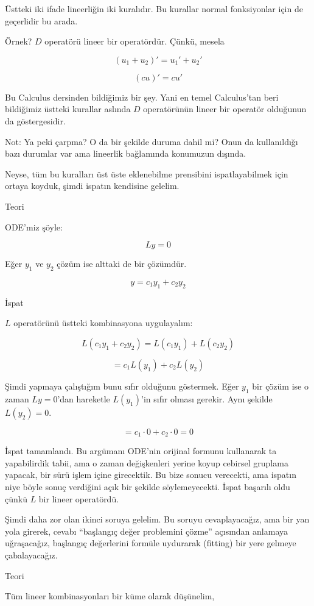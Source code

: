 \documentclass[12pt,fleqn]{article}\usepackage{../../common}
\begin{document}
Üstteki iki ifade lineerliğin iki kuralıdır. Bu kurallar normal
fonksiyonlar için de geçerlidir bu arada. 

Örnek? $D$ operatörü lineer bir operatördür. Çünkü, mesela

$$ (u_1 + u_2)' = u_1' + u_2' $$

$$ (cu)' = cu' $$

Bu Calculus dersinden bildiğimiz bir şey. Yani en temel Calculus'tan
beri bildiğimiz üstteki kurallar aslında $D$ operatörünün lineer bir
operatör olduğunun da göstergesidir.

Not: Ya peki çarpma? O da bir şekilde duruma dahil mi? Onun da kullanıldığı
bazı durumlar var ama lineerlik bağlamında konumuzun dışında.

Neyse, tüm bu kuralları üst üste eklenebilme prensibini ispatlayabilmek
için ortaya koyduk, şimdi ispatın kendisine gelelim. 

Teori

ODE'miz şöyle:

$$ Ly = 0 $$

Eğer $y_1$ ve $y_2$ çözüm ise alttaki de bir çözümdür.

$$ y = c_1 y_1 + c_2 y_2 $$

İspat

$L$ operatörünü üstteki kombinasyona uygulayalım:

$$ L(c_1 y_1 + c_2 y_2) = L(c_1 y_1) + L(c_2 y_2)$$

$$ = c_1L(y_1) + c_2L(y_2)$$

Şimdi yapmaya çalıştığım bunu sıfır olduğunu göstermek. Eğer $y_1$ bir
çözüm ise o zaman $Ly=0$'dan hareketle $L(y_1)$'in sıfır olması
gerekir. Aynı şekilde $L(y_2) = 0$.

$$ = c_1 \cdot 0 + c_2 \cdot 0 = 0 $$

İspat tamamlandı. Bu argümanı ODE'nin orijinal formunu kullanarak ta
yapabilirdik tabii, ama o zaman değişkenleri yerine koyup cebirsel gruplama
yapacak, bir sürü işlem içine girecektik. Bu bize sonucu verecekti, ama ispatın
niye böyle sonuç verdiğini açık bir şekilde söylemeyecekti. İspat başarılı oldu
çünkü $L$ bir lineer operatördü.

Şimdi daha zor olan ikinci soruya gelelim. Bu soruyu cevaplayacağız, ama
bir yan yola girerek, cevabı ``başlangıç değer problemini çözme'' açısından
anlamaya uğraşacağız, başlangıç değerlerini formüle uydurarak (fitting) bir
yere gelmeye çabalayacağız. 

Teori

Tüm lineer kombinasyonları bir küme olarak düşünelim, 
\end{document}
